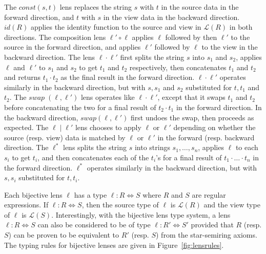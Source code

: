 \documentclass{svproc}
\begin{document}
The $\mathit{const}(s, t)$ lens replaces the string $s$ with $t$ in the source
data in the forward direction, and $t$ with $s$ in the view data in the backward
direction. $\mathit{id}(R)$ applies the identity function to the source and view
in $\mathcal{L}(R)$ in both directions. The composition lens $\ell' \circ \ell$
applies $\ell$ followed by then $\ell'$ to the source in the forward direction,
and applies $\ell'$ followed by $\ell$ to the view in the backward direction.
The lens $\ell \cdot \ell'$ first splits the string $s$ into $s_1$ and $s_2$,
applies $\ell$ and $\ell'$ to $s_1$ and $s_2$ to get $t_1$ and $t_2$
respectively, then concatenates $t_1$ and $t_2$ and returns $t_1 \cdot t_2$ as
the final result in the forward direction. $\ell \cdot \ell'$ operates
similarly in the backward direction, but with $s, s_1$ and $s_2$ substituted
for $t, t_1$ and $t_2$. The $\mathit{swap} \; (\ell, \ell')$ lens operates
like $\ell \cdot \ell'$, except that it swaps $t_1$ and $t_2$ before
concatenating the two for a final result of $t_2 \cdot t_1$ in the forward
direction. In the backward direction, $\mathit{swap}(\ell, \ell')$ first undoes
the swap, then proceeds as expected. The $\ell \; | \; \ell'$ lens
chooses to apply $\ell$ or $\ell'$ depending on whether the source
(resp. view) data is matched by $\ell$ or $\ell'$ in the forward (resp.
backward direction. The $\ell^*$ lens splits the string $s$ into strings $s_1,
\ldots, s_n$, applies $\ell$ to each $s_i$ to get $t_i$, and then concatenates
each of the $t_i$'s for a final result of $t_1 \cdot \ldots \cdot t_n$ in the
forward direction. $\ell^*$ operates similarly in the backward direction, but
with $s, s_i$ substituted for $t, t_i$.

Each bijective lens $\ell$ has a type $\ell : R \Leftrightarrow S$ where $R$ and
$S$ are regular expressions. If $\ell : R \Leftrightarrow S$, then the source
type of $\ell$ is $\mathcal{L}(R)$ and the view type of $\ell$ is
$\mathcal{L}(S)$. Interestingly, with the bijective lens type system, a lens
$\ell : R \Leftrightarrow S$ can also be considered to be of type $\ell : R'
\Leftrightarrow S'$ provided that $R$ (resp. $S$) can be proven to be
equivalent to $R'$ (resp. $S$) from the star-semiring axioms. The typing rules
for bijective lenses are given in Figure~\ref{fig:lensrules}. 
\end{document}
